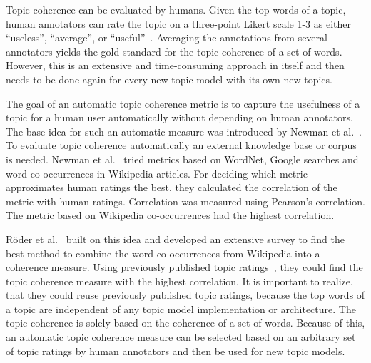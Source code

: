 \documentclass[
        a4paper,
        titlepage,
        twoside,
        parskip,
        numbers=noenddot
        ]{scrbook}
\theoremstyle{break}
\begin{document}
Topic coherence can be evaluated by humans.
Given the top words of a topic, human annotators can rate the topic on a three-point Likert scale 1-3 as either ``useless'', ``average'', or ``useful''~\cite{Aletras2013}.
Averaging the annotations from several annotators yields the gold standard for the topic coherence of a set of words.
However, this is an extensive and time-consuming approach in itself and then needs to be done again for every new topic model with its own new topics.

The goal of an automatic topic coherence metric is to capture the usefulness of a topic for a human user automatically without depending on human annotators.
The base idea for such an automatic measure was introduced by Newman et al.~\cite{Newman2010}.
To evaluate topic coherence automatically an external knowledge base or corpus is needed.
Newman et al.~\cite{Newman2010} tried metrics based on WordNet, Google searches and word-co-occurrences in Wikipedia articles.
For deciding which metric approximates human ratings the best, they calculated the correlation of the metric with human ratings.
Correlation was measured using Pearson's correlation.
The metric based on Wikipedia co-occurrences had the highest correlation.



Röder et al.~\cite{Roder2015} built on this idea and developed an extensive survey to find the best method to combine the word-co-occurrences from Wikipedia into a coherence measure.
Using previously published topic ratings~\cite{Aletras2013,Chang2009,Newman2010,Rosner2013}, they could find the topic coherence measure with the highest correlation.
It is important to realize, that they could reuse previously published topic ratings, because the top words of a topic are independent of any topic model implementation or architecture.
The topic coherence is solely based on the coherence of a set of words.
Because of this, an automatic topic coherence measure can be selected based on an arbitrary set of topic ratings by human annotators and then be used for new topic models.
\end{document}
